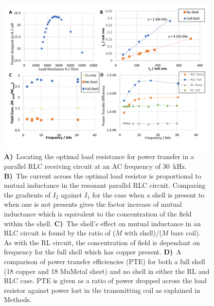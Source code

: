 \documentclass[11pt]{iopart}
\begin{document}
\begin{figure}
  \begin{center}
   \noindent\includegraphics[width=\linewidth]{images/compoundRLC.pdf}
  \end{center}
  \caption{
    \textbf{A)}~Locating the optimal load resistance for power transfer in a
    parallel RLC receiving circuit at an AC frequency of $30$~kHz.
    \textbf{B)}~The current across the optimal load resistor is proportional to
    mutual inductance in the resonant parallel RLC circuit. Comparing
    the gradients of $I_2$ against $I_1$ for the case when a shell is
    present to when one is not presents gives the factor increase of
    mutual inductance which is equivalent to the concentration of the
    field within the shell.  
    \textbf{C)}~The shell's effect on mutual inductance in an RLC circuit is
    found by the ratio of ($M$ with shell)/($M$ bare coil). As with
    the RL circuit, the concentration of field is dependant on
    frequency for the full shell which has copper present.
    \textbf{D)}~A comparison of power transfer efficiencies (PTE) for both a
    full shell (18 copper and 18 MuMetal sheet) and no shell in either
    the RL and RLC case. PTE is given as a ratio of power dropped
    across the load resistor against power lost in the transmitting
    coil as explained in Methods.
  }
  \label{fig:cpdRLC}
\end{figure}
\end{document}
